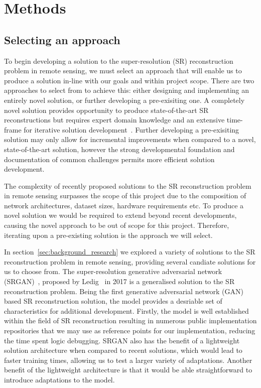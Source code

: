 \chapter{Methods}\label{chapter2}
\section{Selecting an approach}
To begin developing a solution to the super-resolution (SR) reconstruction problem in remote sensing, we must select an approach that will enable us to produce a solution in-line with our goals and within project scope. There are two approaches to select from to achieve this: either designing and implementing an entirely novel solution, or further developing a pre-exisiting one. A completely novel solution provides opportunity to produce state-of-the-art SR reconstructions but requires expert domain knowledge and an extensive time-frame for iterative solution development~\cite{ref}. Further developing a pre-exisiting solution may only allow for incremental improvements when compared to a novel, state-of-the-art solution, however the strong developmental foundation and documentation of common challenges permits more efficient solution development.

The complexity of recently proposed solutions to the SR reconstruction problem in remote sensing surpasses the scope of this project due to the composition of network architectures, dataset sizes, hardware requirements etc. To produce a novel solution we would be required to extend beyond recent developments, causing the novel approach to be out of scope for this project. Therefore, iterating upon a pre-existing solution is the approach we will select.

In section~\ref{sec:background_research} we explored a variety of solutions to the SR reconstruction problem in remote sensing, providing several candiate solutions for us to choose from. The super-resolution generative adversarial network (SRGAN)~\cite{srgan}, proposed by Ledig \etal\ in 2017 is a generalised solution to the SR reconstruction problem. Being the first generative adversarial network (GAN) based SR reconstruction solution, the model provides a desriable set of characteristics for additional development. Firstly, the model is well established within the field of SR reconstruction resulting in numerous public implementation repositories that we may use as reference points for our implementation, reducing the time spent logic debugging. SRGAN also has the benefit of a lightweight solution architecture when compared to recent solutions, which would lead to faster training times, allowing us to test a larger variety of adaptations. Another benefit of the lightweight architecture is that it would be able straightforward to introduce adaptations to the model. 

